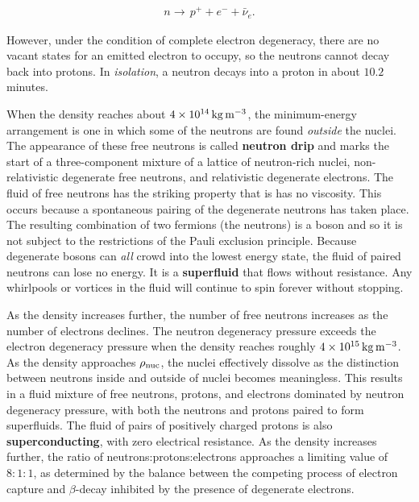 \documentclass[a4paper,10pt]{article}
\begin{document}
\begin{align*}
    n \rightarrow\,p^+ + e^- + \bar{\nu}_e.
\end{align*}

{\noindent}However, under the condition of complete electron degeneracy, there are no vacant states for an emitted electron to occupy, so the neutrons cannot decay back into protons. In \textit{isolation}, a neutron decays into a proton in about $10.2$ minutes.

{\noindent}When the density reaches about $4\times10^{14}\,{\rm kg\,m^{-3}}$, the minimum-energy arrangement is one in which some of the neutrons are found \textit{outside} the nuclei. The appearance of these free neutrons is called \textbf{neutron drip} and marks the start of a three-component mixture of a lattice of neutron-rich nuclei, non-relativistic degenerate free neutrons, and relativistic degenerate electrons. The fluid of free neutrons has the striking property that is has no viscosity. This occurs because a spontaneous pairing of the degenerate neutrons has taken place. The resulting combination of two fermions (the neutrons) is a boson and so it is not subject to the restrictions of the Pauli exclusion principle. Because degenerate bosons can \textit{all} crowd into the lowest energy state, the fluid of paired neutrons can lose no energy. It is a \textbf{superfluid} that flows without resistance. Any whirlpools or vortices in the fluid will continue to spin forever without stopping.

{\noindent}As the density increases further, the number of free neutrons increases as the number of electrons declines. The neutron degeneracy pressure exceeds the electron degeneracy pressure when the density reaches roughly $4\times10^{15}\,{\rm kg\,m^{-3}}$. As the density approaches $\rho_{\rm nuc}$, the nuclei effectively dissolve as the distinction between neutrons inside and outside of nuclei becomes meaningless. This results in a fluid mixture of free neutrons, protons, and electrons dominated by neutron degeneracy pressure, with both the neutrons and protons paired to form superfluids. The fluid of pairs of positively charged protons is also \textbf{superconducting}, with zero electrical resistance. As the density increases further, the ratio of neutrons:protons:electrons approaches a limiting value of $8:1:1$, as determined by the balance between the competing process of electron capture and $\beta$-decay inhibited by the presence of degenerate electrons.
\end{document}
